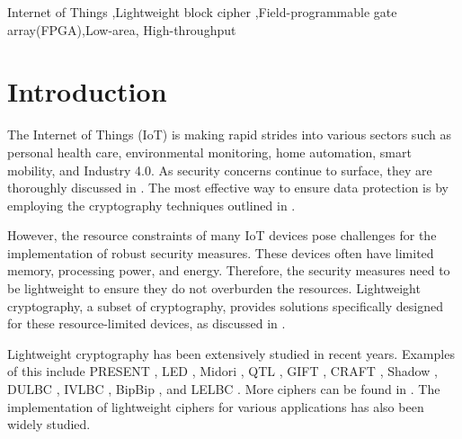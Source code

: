 \documentclass[final,5p,times,twocolumn]{elsarticle}
\begin{document}
\begin{frontmatter}
    \begin{keyword}
        Internet of Things  \sep Lightweight block cipher \sep Field-programmable gate array(FPGA)\sep  Low-area, High-throughput

    \end{keyword}

\end{frontmatter}




\section{Introduction}\label{sec1}

The Internet of Things (IoT) is making rapid strides into various sectors such as personal health care, environmental monitoring, home automation, smart mobility, and Industry 4.0. As security concerns continue to surface, they are thoroughly discussed in \cite{Meneghello2019a}. The most effective way to ensure data protection is by employing the cryptography techniques outlined in \cite{Swessi2022}.

However, the resource constraints of many IoT devices pose challenges for the implementation of robust security measures. These devices often have limited memory, processing power, and energy. Therefore, the security measures need to be lightweight to ensure they do not overburden the resources. Lightweight cryptography, a subset of cryptography, provides solutions specifically designed for these resource-limited devices, as discussed in \cite{Mohajerani2020}.

Lightweight cryptography has been extensively studied in recent years. Examples of this include PRESENT \cite{Bogdanov2007}, LED \cite{Guo2011}, Midori \cite{Banik2015a}, QTL \cite{Li2016}, GIFT \cite{Banik2017}, CRAFT \cite{Beierle2019}, Shadow \cite{Guo2021}, DULBC \cite{Yang2022}, IVLBC \cite{Huang2023}, BipBip \cite{Belkheyar2023}, and LELBC \cite{Song2024}. More ciphers can be found in \cite{Zakaria2023}. The implementation of lightweight ciphers for various applications has also been widely studied.
\end{document}
